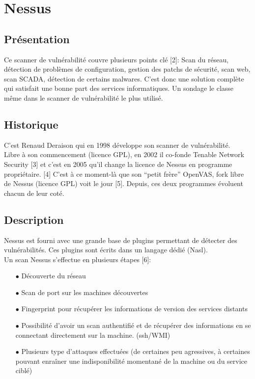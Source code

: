 \section{Nessus}
\thispagestyle{plain}
\subsection{Présentation}
Ce scanner de vulnérabilité couvre plusieurs points clé [2]: Scan du réseau, détection de problèmes de configuration, gestion des patchs de sécurité, scan web, scan SCADA, détection de certains malwares. C’est donc une solution complète qui satisfait une bonne part des services informatiques. Un sondage le classe même dans le scanner de vulnérabilité le plus utilisé.

\subsection{Historique}
C’est Renaud Deraison qui en 1998 développe son scanner de vulnérabilité.\\
Libre à son commencement (licence GPL), en 2002 il co-fonde Tenable Network Security [3] et c’est en 2005 qu’il change la licence de Nessus en programme propriétaire. [4] C’est à ce moment-là que son ``petit frère'' OpenVAS, fork libre de Nessus (licence GPL) voit le jour [5]. Depuis, ces deux programmes évoluent chacun de leur coté.

\subsection{Description}
Nessus est fourni avec une grande base de plugins permettant de détecter des vulnérabilités. Ces plugins sont écrits dans un langage dédié (Nasl).\\
Un scan Nessus s’effectue en plusieurs étapes [6]:\\
\begin{itemize}
\item [$\bullet$]Découverte du réseau\\
\item [$\bullet$]Scan de port sur les machines découvertes\\
\item [$\bullet$]Fingerprint pour récupérer les informations de version des services distants\\
\item [$\bullet$]Possibilité d’avoir un scan authentifié et de récupérer des informations en se connectant directement sur la machine. (ssh/WMI)\\
\item [$\bullet$]Plusieurs type d’attaques effectuées (de certaines peu agressives, à certaines pouvant enraîner une indisponibilité momentané de la machine ou du service ciblé)\\
\end{itemize}

